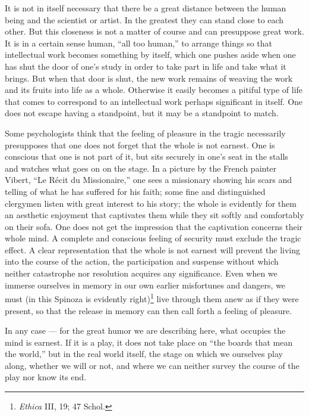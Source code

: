 \documentclass[12pt]{book}
\newcommand{\opage}[1]{\marginnote{\footnotesize\textit{[#1]}}}
\begin{document}
It is not in itself necessary that there be a great distance between the human being
and the scientist or artist. In the greatest they can stand close to each other. But
this closeness is not a matter of course and can presuppose great work. It is in a
certain sense human, ``all too human,'' to arrange things so that intellectual work
becomes something by itself, which one pushes aside when one has shut the door of one's
study in order to take part in life and take what it brings. But when that door is
shut, the new work remains of weaving the work and its fruits into life as a whole.
Otherwise it easily becomes a pitiful type of life \opage{95}that comes to correspond to
an intellectual work perhaps significant in itself. One does not escape having a
standpoint, but it may be a standpoint to match.

Some psychologists think that the feeling of pleasure in the tragic necessarily
presupposes that one does not forget that the whole is not earnest. One is conscious
that one is not part of it, but sits securely in one's seat in the stalls and watches
what goes on on the stage. In a picture by the French painter Vibert, ``Le Récit du
Missionaire,'' one sees a missionary showing his scars and telling of what he has
suffered for his faith; some fine and distinguished clergymen listen with great
interest to his story; the whole is evidently for them an aesthetic enjoyment that
captivates them while they sit softly and comfortably on their sofa. One does not get
the impression that the captivation concerns their whole mind. A complete and conscious
feeling of security must exclude the tragic effect. A clear representation that the
whole is not earnest will prevent the living into the course of the action, the
participation and suspense without which neither catastrophe nor resolution acquires any
significance. Even when we immerse ourselves in memory in our own earlier misfortunes and
dangers, we must (in this Spinoza is evidently right)\footnote{\textit{Ethica} III, 19;
47 Schol.} live through them anew as if they were present, so that the release in memory
can then call forth a feeling of pleasure.

In any case --- for the great humor we are describing here, what occupies the mind is
earnest. If it is a play, it does not take place on ``the boards that mean the world,''
but in the real world itself, the stage on which we ourselves play along, whether we
will or not, and where we can neither survey the course of the play nor know its end.
\end{document}
